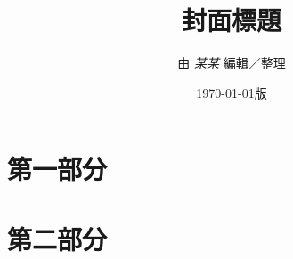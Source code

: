 \documentclass[UTF8, nofont, landscape]{ctexbook} %
\title{\zihao{0}\textbf{封面標題}}
\author{\normalsize 由 \textit{某某} 編輯／整理}
\date{\normalsize\today 版}
\begin{document}
\maketitle
\tableofcontents

\part{第一部分}
\LARGE


\part{第二部分}
\LARGE


\end{document}
